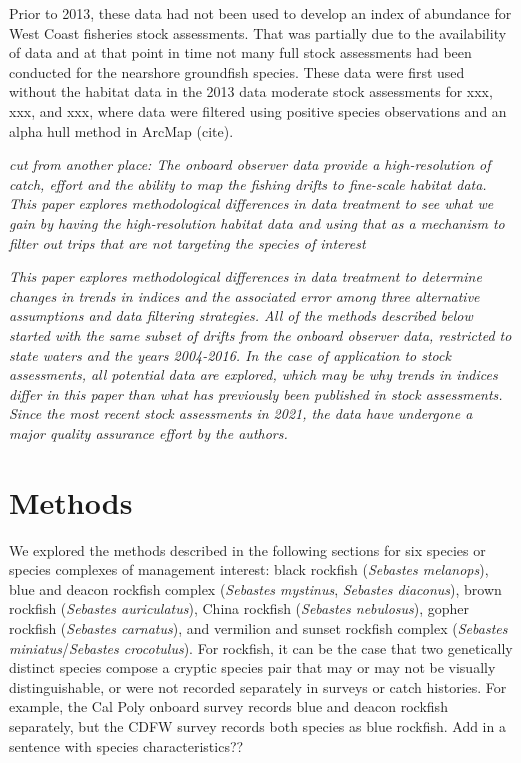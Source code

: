 \documentclass[
  authoryear,
  preprint,
  3p]{elsarticle}
\begin{document}
Prior to 2013, these data had not been used to develop an index of
abundance for West Coast fisheries stock assessments. That was partially
due to the availability of data and at that point in time not many full
stock assessments had been conducted for the nearshore groundfish
species. These data were first used without the habitat data in the 2013
data moderate stock assessments for xxx, xxx, and xxx, where data were
filtered using positive species observations and an alpha hull method in
ArcMap (cite).

\emph{cut from another place: The onboard observer data provide a
high-resolution of catch, effort and the ability to map the fishing
drifts to fine-scale habitat data. This paper explores methodological
differences in data treatment to see what we gain by having the
high-resolution habitat data and using that as a mechanism to filter out
trips that are not targeting the species of interest}

\emph{This paper explores methodological differences in data treatment
to determine changes in trends in indices and the associated error among
three alternative assumptions and data filtering strategies. All of the
methods described below started with the same subset of drifts from the
onboard observer data, restricted to state waters and the years
2004-2016. In the case of application to stock assessments, all
potential data are explored, which may be why trends in indices differ
in this paper than what has previously been published in stock
assessments. Since the most recent stock assessments in 2021, the data
have undergone a major quality assurance effort by the authors.}

\hypertarget{methods}{%
\section{Methods}\label{methods}}

We explored the methods described in the following sections for six
species or species complexes of management interest: black rockfish
(\emph{Sebastes melanops}), blue and deacon rockfish complex
(\emph{Sebastes mystinus}, \emph{Sebastes diaconus}), brown rockfish
(\emph{Sebastes auriculatus}), China rockfish (\emph{Sebastes
nebulosus}), gopher rockfish (\emph{Sebastes carnatus}), and vermilion
and sunset rockfish complex (\emph{Sebastes miniatus}/\emph{Sebastes
crocotulus}). For rockfish, it can be the case that two genetically
distinct species compose a cryptic species pair that may or may not be
visually distinguishable, or were not recorded separately in surveys or
catch histories. For example, the Cal Poly onboard survey records blue
and deacon rockfish separately, but the CDFW survey records both species
as blue rockfish. Add in a sentence with species characteristics??
\end{document}
